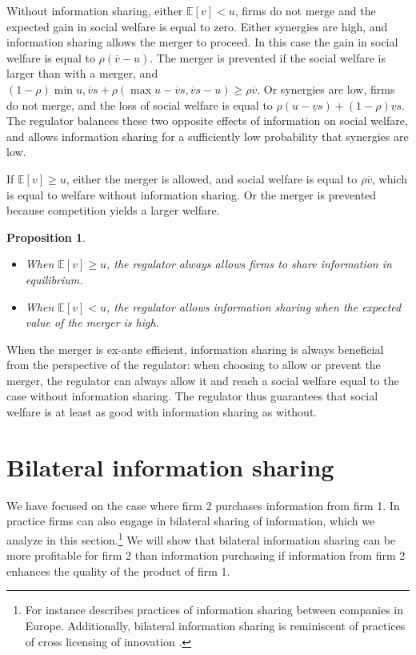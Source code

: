 \documentclass[a4paper,leqno]{article}%
\newtheorem{prop}{Proposition}
\newcommand{\E}{\mathbb E}
\newcommand{\uv}{\underline{v}}
\newcommand{\ov}{\overline{v}}
\begin{document}
\medskip

Without information sharing, either $\E[v]<u$, firms do not merge and the expected gain in social welfare is equal to zero. Either synergies are high, and information sharing allows the merger to proceed. In this case the gain in social welfare is equal to $\rho (\ov-u)$. The merger is prevented if the social welfare is larger than with a merger, and $(1-\rho)\min{u,\ov s}+\rho (\max{u-\ov s,\ov s-u})\geq \rho \ov$. Or synergies are low, firms do not merge, and the loss of social welfare is equal to $\rho (u-\uv s)+(1-\rho)\uv s$. The regulator balances these two opposite effects of information on social welfare, and allows information sharing for a sufficiently low probability that synergies are low.

\medskip

If $\E[v]\geq u$, either the merger is allowed, and social welfare is equal to $\rho \ov$, which is equal to welfare without information sharing. Or the merger is prevented because competition yields a larger welfare.

\medskip


\begin{prop}~~

\begin{itemize}
    \item When $\E[v]\geq u$, the regulator always allows firms to share information in equilibrium.
    \item When $\E[v]< u$, the regulator allows information sharing when the expected value of the merger is high.
\end{itemize}


\end{prop}

\noindent When the merger is ex-ante efficient, information sharing is always beneficial from the perspective of the regulator: when choosing to allow or prevent the merger, the regulator can always allow it and reach a social welfare equal to the case without information sharing. The regulator thus guarantees that social welfare is at least as good with information sharing as without.


\section{Bilateral information sharing}\label{bilat}

We have focused on the case where firm 2 purchases information from firm 1. In practice firms can also engage in bilateral sharing of information, which we analyze in this section.\footnote{For instance \cite{scaria2018study} describes practices of information sharing between companies in Europe. Additionally, bilateral information sharing is reminiscent of practices of cross licensing of innovation \citep{fershtman1992cross}.} We will show that bilateral information sharing can be more profitable for firm 2 than information purchasing if information from firm 2 enhances the quality of the product of firm 1.
\end{document}
